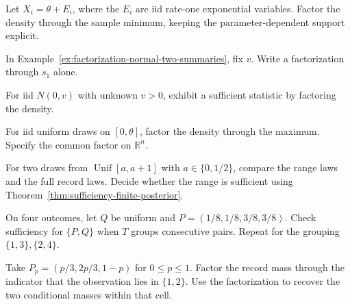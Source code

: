 \documentclass[11pt,oneside]{book}
\theoremstyle{definition}
\theoremstyle{remark}
\newcommand{\R}{\mathbb R}
\begin{document}
\begin{practiceexercise}
\label{pex:factorization-shifted-exponential}
Let $X_i=\theta+E_i$, where the $E_i$ are iid rate-one
exponential variables. Factor the density through the sample
minimum, keeping the parameter-dependent support explicit.
\end{practiceexercise}

\begin{practiceexercise}
\label{pex:factorization-normal-known-variance}
In Example~\ref{ex:factorization-normal-two-summaries}, fix
$v$. Write a factorization through $s_1$ alone.
\end{practiceexercise}

\begin{practiceexercise}
\label{pex:factorization-normal-known-mean}
For iid $N(0,v)$ with unknown $v>0$, exhibit a sufficient
statistic by factoring the density.
\end{practiceexercise}

\begin{practiceexercise}
\label{pex:factorization-uniform-one-endpoint}
For iid uniform draws on $[0,\theta]$, factor the density
through the maximum. Specify the common factor on $\R^n$.
\end{practiceexercise}

\begin{practiceexercise}
\label{pex:factorization-uniform-range-failure}
For two draws from $\operatorname{Unif}[a,a+1]$ with
$a\in\{0,1/2\}$, compare the range laws and the full record laws.
Decide whether the range is sufficient using
Theorem~\ref{thm:sufficiency-finite-posterior}.
\end{practiceexercise}

\begin{practiceexercise}
\label{pex:factorization-finite-ratio-cells}
On four outcomes, let $Q$ be uniform and $P=(1/8,1/8,3/8,3/8)$.
Check sufficiency for $\{P,Q\}$ when $T$ groups consecutive
pairs. Repeat for the grouping $\{1,3\},\{2,4\}$.
\end{practiceexercise}

\begin{practiceexercise}
\label{pex:factorization-split-fixed-weights}
Take $P_p=(p/3,2p/3,1-p)$ for $0\leq p\leq1$. Factor the
record mass through the indicator that the observation lies
in $\{1,2\}$. Use the factorization to recover the two
conditional masses within that cell.
\end{practiceexercise}
\end{document}
